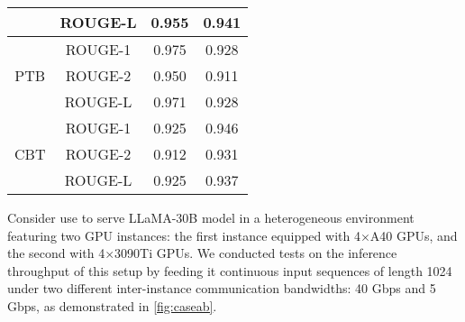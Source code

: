 {\begin{table}[!t]
{\begin{tabular}{c c c c}
                           & ROUGE-L & 0.955 & 0.941 \\ \hline
\multirow{3}{*}{PTB}       & ROUGE-1 & 0.975 & 0.928 \\ 
                           & ROUGE-2 & 0.950  & 0.911 \\ 
                           & ROUGE-L & 0.971 & 0.928 \\ \hline
\multirow{3}{*}{CBT}       & ROUGE-1 & 0.925 & 0.946 \\ 
                           & ROUGE-2 & 0.912 & 0.931 \\ 
                           & ROUGE-L & 0.925 & 0.937 \\ \hline
\end{tabular}
}
\label{tab:rouge_performance}
\end{table}

\begin{table}[h]
\centering
{}
\end{table}


Consider use \sys to serve LLaMA-30B model in a heterogeneous environment featuring two GPU instances: the first instance equipped with 4$\times$A40 GPUs, and the second with 4$\times$3090Ti GPUs. We conducted tests on the inference throughput of this setup by feeding it continuous input sequences of length 1024 under two different inter-instance communication bandwidths: 40 Gbps and 5 Gbps, as demonstrated in \autoref{fig:caseab}.

}
